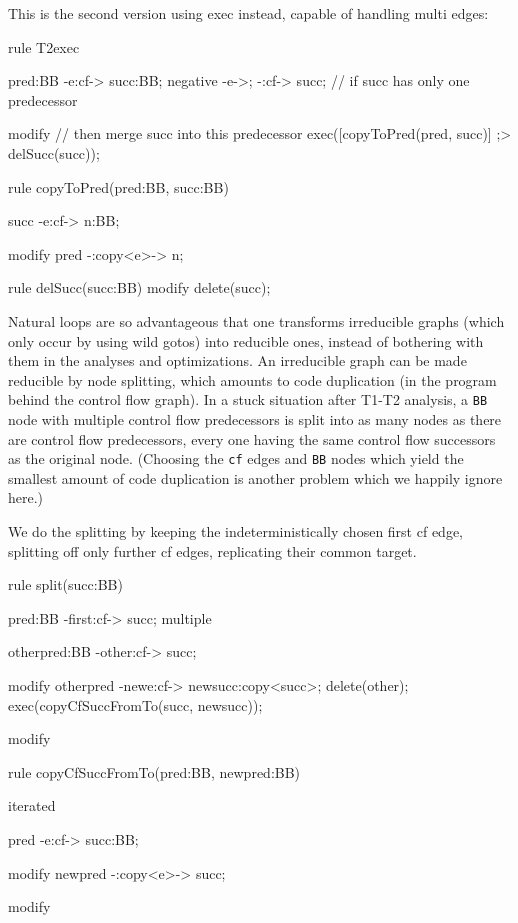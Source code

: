 This is the second version using exec instead, capable of handling multi edges:

  \begin{example}
    \begin{grgen}
rule T2exec
{
  pred:BB -e:cf-> succ:BB;
  negative {
    -e->;
    -:cf-> succ; // if succ has only one predecessor
  }
  
  modify { // then merge succ into this predecessor
    exec([copyToPred(pred, succ)] ;> delSucc(succ));
  }
}

rule copyToPred(pred:BB, succ:BB)
{
  succ -e:cf-> n:BB;
  
  modify {
    pred -:copy<e>-> n;
  }
}

rule delSucc(succ:BB)
{
  modify {
    delete(succ);
  }
}
    \end{grgen}
  \end{example}

Natural loops are so advantageous that one transforms irreducible graphs (which only occur by using wild gotos) into reducible ones, instead of bothering with them in the analyses and optimizations.
An irreducible graph can be made reducible by node splitting, which amounts to code duplication (in the program behind the control flow graph).
In a stuck situation after T1-T2 analysis, a \texttt{BB} node with multiple control flow predecessors is split into as many nodes as there are control flow predecessors, every one having the same control flow successors as the original node.
(Choosing the \texttt{cf} edges and \texttt{BB} nodes which yield the smallest amount of code duplication is another problem which we happily ignore here.)

  \begin{example}
We do the splitting by keeping the indeterministically chosen first cf edge, splitting off only further cf edges, replicating their common target.

    \begin{grgen}
rule split(succ:BB)
{
  pred:BB -first:cf-> succ;
  multiple {
    otherpred:BB -other:cf-> succ;
    
    modify {
      otherpred -newe:cf-> newsucc:copy<succ>;
      delete(other);
      exec(copyCfSuccFromTo(succ, newsucc));
    }
  }
  
  modify {
  }
}

rule copyCfSuccFromTo(pred:BB, newpred:BB)
{
  iterated {
    pred -e:cf-> succ:BB;
    
    modify {
      newpred -:copy<e>-> succ;
    }
  }
  
  modify {
  }
}
    \end{grgen}
  \end{example}

